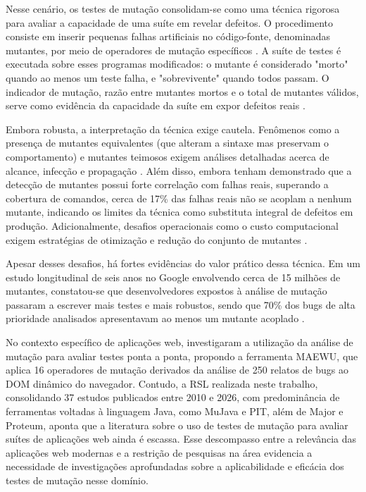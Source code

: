 Nesse cenário, os testes de mutação consolidam-se como uma técnica rigorosa para avaliar a capacidade de uma suíte em revelar defeitos. O procedimento consiste em inserir pequenas falhas artificiais no código-fonte, denominadas mutantes, por meio de operadores de mutação específicos \cite{guerino2024}. A suíte de testes é executada sobre esses programas modificados: o mutante é considerado "morto" quando ao menos um teste falha, e "sobrevivente" quando todos passam. O indicador de mutação, razão entre mutantes mortos e o total de mutantes válidos, serve como evidência da capacidade da suíte em expor defeitos reais \cite{just2014}.

Embora robusta, a interpretação da técnica exige cautela. Fenômenos como a presença de mutantes equivalentes (que alteram a sintaxe mas preservam o comportamento) e mutantes teimosos exigem análises detalhadas acerca de alcance, infecção e propagação \cite{yao2014}. Além disso, embora  tenham demonstrado que a detecção de mutantes possui forte correlação com falhas reais, superando a cobertura de comandos, cerca de 17\% das falhas reais não se acoplam a nenhum mutante, indicando os limites da técnica como substituta integral de defeitos em produção. Adicionalmente, desafios operacionais como o custo computacional exigem estratégias de otimização e redução do conjunto de mutantes \cite{kintis2010, guizzo2022}.

Apesar desses desafios, há fortes evidências do valor prático dessa técnica. Em um estudo longitudinal de seis anos no Google envolvendo cerca de 15 milhões de mutantes, constatou-se que desenvolvedores expostos à análise de mutação passaram a escrever mais testes e mais robustos, sendo que 70\% dos bugs de alta prioridade analisados apresentavam ao menos um mutante acoplado \cite{petrovic2021}.

No contexto específico de aplicações web,  investigaram a utilização da análise de mutação para avaliar testes ponta a ponta, propondo a ferramenta MAEWU, que aplica 16 operadores de mutação derivados da análise de 250 relatos de bugs ao DOM dinâmico do navegador. Contudo, a RSL realizada neste trabalho, consolidando 37 estudos publicados entre 2010 e 2026, com predominância de ferramentas voltadas à linguagem Java, como MuJava e PIT, além de Major e Proteum, aponta que a literatura sobre o uso de testes de mutação para avaliar suítes de aplicações web ainda é escassa. Esse descompasso entre a relevância das aplicações web modernas e a restrição de pesquisas na área evidencia a necessidade de investigações aprofundadas sobre a aplicabilidade e eficácia dos testes de mutação nesse domínio.

